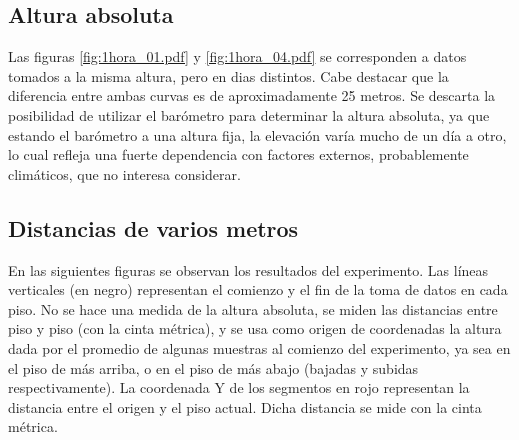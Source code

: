 \documentclass[main]{subfiles}
\begin{document}
\subsection{Altura absoluta}

Las figuras \ref{fig:1hora_01.pdf} y \ref{fig:1hora_04.pdf} se corresponden a datos tomados a la misma altura, pero en dias distintos. Cabe destacar que la diferencia entre ambas curvas es de aproximadamente 25 metros. Se descarta la posibilidad de utilizar el barómetro para determinar la altura absoluta, ya que estando el barómetro a una altura fija, la elevación varía mucho de un día a otro, lo cual refleja una fuerte dependencia con factores externos, probablemente climáticos, que no interesa considerar.

\subsection{Distancias de varios metros}

En las siguientes figuras se observan los resultados del experimento. Las líneas verticales (en negro) representan el comienzo y el fin de la toma de datos en cada piso. No se hace una medida de la altura absoluta, se miden las distancias entre piso y piso (con la cinta métrica), y se usa como origen de coordenadas la altura dada por el promedio de algunas muestras al comienzo del experimento, ya sea en el piso de más arriba, o en el piso de más abajo (bajadas y subidas respectivamente). La coordenada Y de los segmentos en rojo representan la distancia entre el origen y el piso actual. Dicha distancia se mide con la cinta métrica.
\end{document}
